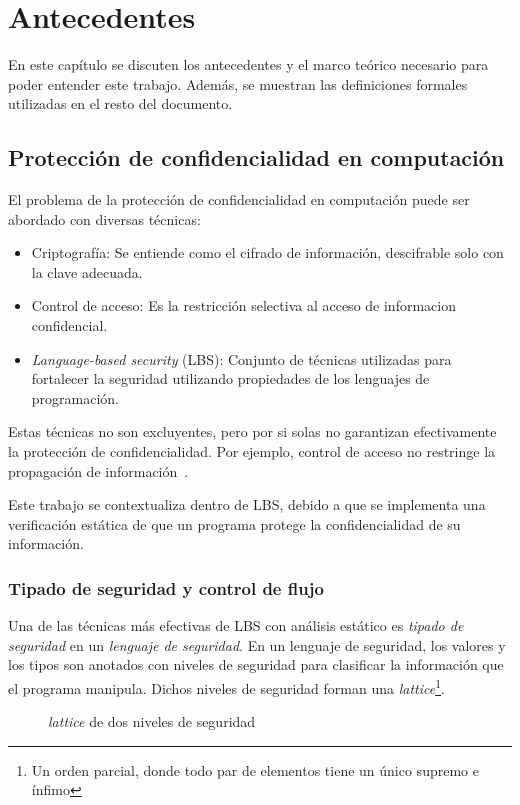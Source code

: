 \chapter{Antecedentes}

En este capítulo se discuten los antecedentes y el marco teórico necesario para poder entender este trabajo. Además, se muestran las definiciones formales utilizadas en el resto del documento.

\section{Protección de confidencialidad en computación}
El problema de la protección de confidencialidad en computación puede ser abordado con diversas técnicas:

\begin{itemize}
  \item Criptografía: Se entiende como el cifrado de información, descifrable solo con la clave adecuada.
  \item Control de acceso: Es la restricción selectiva al acceso de informacion confidencial.
  \item \textit{Language-based security} (LBS): Conjunto de técnicas utilizadas para fortalecer la seguridad utilizando propiedades de los lenguajes de programación.
\end{itemize}

Estas técnicas no son excluyentes, pero por si solas no garantizan efectivamente la protección de confidencialidad. Por ejemplo, control de acceso no restringe la propagación de información~\cite{myers-phd}.

Este trabajo se contextualiza dentro de LBS, debido a que se implementa una verificación estática de que un programa protege la confidencialidad de su información.

\subsection{Tipado de seguridad y control de flujo}
Una de las técnicas más efectivas de LBS con análisis estático es \textit{tipado de seguridad} en un \textit{lenguaje de seguridad}. En un lenguaje de seguridad, los valores y los tipos son anotados con niveles de seguridad para clasificar la información que el programa manipula. Dichos niveles de seguridad forman una \textit{lattice}\footnote{Un orden parcial, donde todo par de elementos tiene un único supremo e ínfimo}.

	\begin{figure}[ht]
		\centering
		\caption{\textit{lattice} de dos niveles de seguridad}
	\end{figure}



